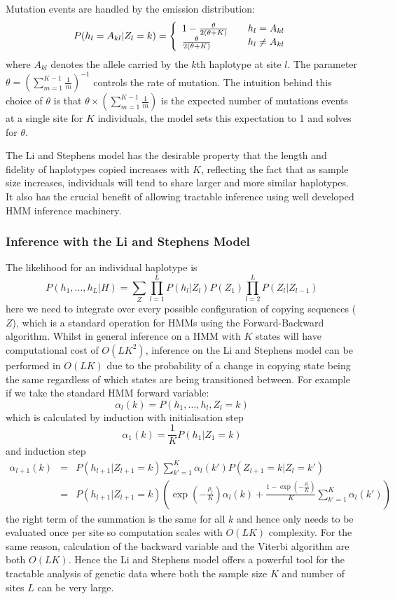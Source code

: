 Mutation events are handled by the emission distribution:
\begin{equation}
P(h_l= A_{kl}|Z_l=k) = \left\{ 
  \begin{array}{l l}
    1-\frac{\theta}{2(\theta+K)}               & \quad h_l = A_{kl}  \\
    \frac{\theta}{2(\theta+K)}      & \quad h_l \neq A_{kl} 
  \end{array}  
\right.
\label{chap3:listephenmut}
\end{equation}
where $A_{kl}$ denotes the allele carried by the $k$th haplotype at site $l$. The parameter  $\theta = (\sum_{m=1}^{K-1} \frac{1}{m})^{-1}$ controls the rate of mutation.  The intuition behind this choice of $\theta$ is that $\theta \times (\sum_{m=1}^{K-1} \frac{1}{m})$ is the expected number of mutations events at a single site for $K$ individuals, the model sets this expectation to 1 and solves for $\theta$.

The Li and Stephens model has the desirable property that the length and fidelity of haplotypes copied increases with $K$, reflecting the fact that as sample size increases, individuals will tend to share larger and more similar haplotypes. It also has the crucial benefit of allowing tractable inference using well developed HMM inference machinery.

\subsubsection{Inference with the Li and Stephens Model}
The likelihood for an individual haplotype is
$$P(h_1,\ldots, h_L|H) = \sum_Z \prod_{l=1}^L P(h_l|Z_l) P(Z_1) \prod_{l=2}^L  P(Z_l|Z_{l-1})$$
here we need to integrate over every possible configuration of copying sequences ($Z$), which is a standard operation for HMMs using the Forward-Backward algorithm. Whilst in general inference on a HMM with $K$ states will have computational cost of  
$O(LK^2)$, inference on the Li and Stephens model can be performed in $O(LK)$ due to the probability of a change in copying state being the same regardless of which states are being transitioned between.  For example if we take the standard HMM forward variable:
$$\alpha_l(k) = P(h_1,\ldots,h_l,Z_l=k)$$
which is calculated by induction with initialisation step
$$\alpha_1(k) = \frac{1}{K} P(h_1|Z_1=k)$$
and induction step 
\begin{eqnarray*}
\alpha_{l+1}(k) & = & P(h_{l+1}|Z_{l+1}=k) \sum_{k'=1}^K \alpha_l(k')P(Z_{l+1}=k|Z_l=k') \\
					&=& P(h_{l+1}|Z_{l+1}=k)\left( \exp(-\frac{\rho_l}{K})\alpha_l(k) + \frac{1-\exp(-\frac{\rho_l}{K})}{K}\sum_{k'=1}^K\alpha_l(k')\right)
\end{eqnarray*}
the right term of the summation is the same for all $k$ and hence only needs to be evaluated once per site so computation scales with $O(LK)$ complexity.  For the same reason, calculation of the backward variable and the Viterbi algorithm are both $O(LK)$. Hence the Li and Stephens model offers a powerful tool for the tractable analysis of genetic data where both the sample size $K$ and number of sites $L$ can be very large.

